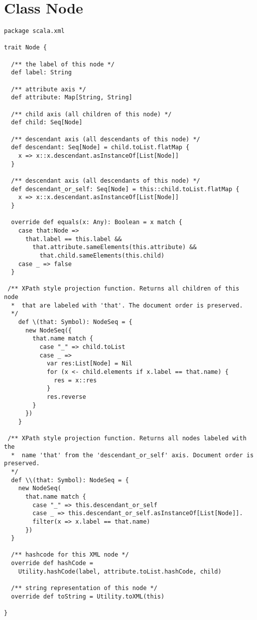 \section{Class Node}\label{cls:Node}
\begin{lstlisting}
package scala.xml 

trait Node {

  /** the label of this node */
  def label: String               

  /** attribute axis */
  def attribute: Map[String, String] 

  /** child axis (all children of this node) */
  def child: Seq[Node]          

  /** descendant axis (all descendants of this node) */
  def descendant: Seq[Node] = child.toList.flatMap { 
    x => x::x.descendant.asInstanceOf[List[Node]] 
  } 

  /** descendant axis (all descendants of this node) */
  def descendant_or_self: Seq[Node] = this::child.toList.flatMap { 
    x => x::x.descendant.asInstanceOf[List[Node]] 
  } 

  override def equals(x: Any): Boolean = x match {
    case that:Node => 
      that.label == this.label && 
        that.attribute.sameElements(this.attribute) && 
          that.child.sameElements(this.child)
    case _ => false
  } 

 /** XPath style projection function. Returns all children of this node
  *  that are labeled with 'that'. The document order is preserved.
  */
    def \(that: Symbol): NodeSeq = {
      new NodeSeq({
        that.name match {
          case "_" => child.toList  
          case _ =>
            var res:List[Node] = Nil 
            for (x <- child.elements if x.label == that.name) {
              res = x::res 
            }
            res.reverse
        }
      }) 
    }

 /** XPath style projection function. Returns all nodes labeled with the 
  *  name 'that' from the 'descendant_or_self' axis. Document order is preserved.
  */
  def \\(that: Symbol): NodeSeq = {
    new NodeSeq(
      that.name match {
        case "_" => this.descendant_or_self 
        case _ => this.descendant_or_self.asInstanceOf[List[Node]].
        filter(x => x.label == that.name) 
      })
  }

  /** hashcode for this XML node */
  override def hashCode = 
    Utility.hashCode(label, attribute.toList.hashCode, child) 

  /** string representation of this node */
  override def toString = Utility.toXML(this) 

}
\end{lstlisting}

